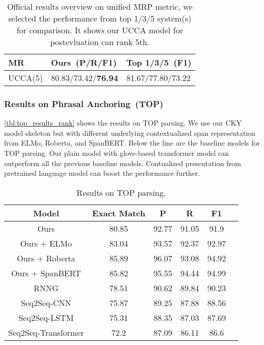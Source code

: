 \begin{table}[!tbp]
\caption{\label{tbl:ucca_results_rank} Official results overview on
  unified MRP metric, we selected the performance from top 1/3/5
  system(s) for comparison. It shows our UCCA model for postevluation
  can rank 5th.}
  \small
\begin{center}
\begin{tabular}{lll}
\toprule
MR     & Ours~(P/R/F1) & Top 1/3/5~(F1)  \\ \hline
UCCA(5)   & 80.83/73.42/\textbf{76.94}   & 81.67/77.80/73.22 \\
\bottomrule
\end{tabular}
\end{center}
\end{table}


\subsubsection{Results on Phrasal Anchoring~(TOP)}
\label{sssec:lex-phr:top-results}
\autoref{tbl:top_results_rank} shows the results on TOP parsing. We
use our CKY model skeleton but with different underlying
contextualized span representation from ELMo, Roberta, and
SpanBERT. Below the line are the baseline models for TOP parsing. Our
plain model with glove-based transformer model can outperform all the
previous baseline models. Contualized presentation from pretrained
language model can boost the performance further.

\begin{table}[!tbp]
\caption{\label{tbl:top_results_rank} Results on TOP parsing.}
\begin{center}
\begin{tabular}{cccccc}
  \toprule
  Model           & Exact Match & P     & R     & F1    \\ \hline
  Ours            & 80.85       & 92.77 & 91.05 & 91.9  \\
  Ours + ELMo     & 83.04       & 93.57 & 92.37 & 92.97 \\
  Ours + Roberta  & 85.89       & 96.07 & 93.08 & 94.92 \\
  Ours + SpanBERT & 85.82       & 95.55 & 94.44 & 94.99 \\ \hline
  RNNG                & 78.51       & 90.62 & 89.84 & 90.23 \\
  Seq2Seq-CNN         & 75.87       & 89.25 & 87.88 & 88.56 \\
  Seq2Seq-LSTM        & 75.31       & 88.35 & 87.03 & 87.69 \\
  Seq2Seq-Transformer & 72.2        & 87.09 & 86.11 & 86.6  \\
  \bottomrule
\end{tabular}
\end{center}
\end{table}

